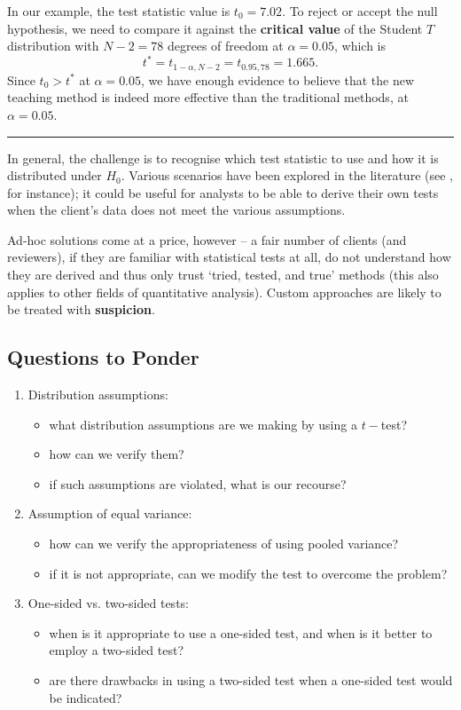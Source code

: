 \newpage\noindent In our example, the test statistic value is $t_{0} = 7.02$. To reject or accept the null hypothesis, we need to compare it against the \textbf{critical value} of the Student $T$ distribution with $N-2=78$ degrees of freedom at $\alpha=0.05$, which is $$t^*= t_{1-\alpha, N-2}=t_{0.95, 78}=1.665.$$ Since $t_{0} > t^*$ at $\alpha=0.05$, we have enough evidence to believe that the new teaching method is indeed more effective than the traditional methods, at $\alpha=0.05$.
\begin{center}
    \rule{0.25\textwidth}{.4pt}
\end{center} In general, the challenge is to recognise which test statistic to use and how it is distributed under $H_0$. Various scenarios have been explored in the literature (see \cite{SA_KNNL}, for instance); it could be useful  for analysts to be able to derive their own tests when the client's data does not meet the various assumptions. \par Ad-hoc solutions come at a price, however -- a fair number of clients (and reviewers), if they are familiar with statistical tests at all, do not understand how they are derived and thus only trust `tried, tested, and true' methods (this also applies to other fields of quantitative analysis). Custom approaches are likely to be treated with \textbf{suspicion}.   

\subsection{Questions to Ponder}
\begin{enumerate}
    \item Distribution assumptions:
    \begin{itemize}[noitemsep]
        \item what distribution assumptions are we making by using a $t-$test?
        \item how can we verify them?
        \item if such assumptions are violated, what is our recourse?
    \end{itemize}
    \item Assumption of equal variance:
    \begin{itemize}[noitemsep]
        \item how can we verify the appropriateness of using pooled variance?
        \item if it is not appropriate, can we modify the test to overcome the problem?
    \end{itemize}
    \item One-sided vs. two-sided tests:
    \begin{itemize}[noitemsep]
        \item when is it appropriate to use a one-sided test, and when is it better to employ a two-sided test?
        \item are there drawbacks in using a two-sided test when a one-sided test would be indicated?
    \end{itemize}
\end{enumerate}

